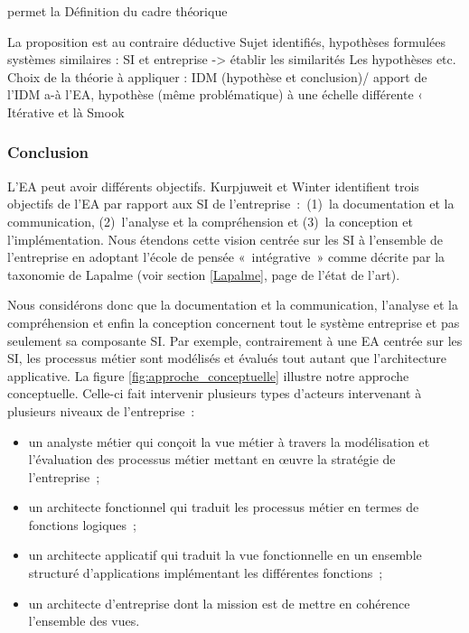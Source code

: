 permet la Définition du cadre théorique 

La proposition est au contraire déductive
Sujet identifiés, hypothèses formulées
systèmes similaires : SI et entreprise -> établir les similarités
Les hypothèses etc.  
Choix de la théorie à appliquer : IDM (hypothèse et conclusion)/ apport de l'IDM 
a-à l'EA, hypothèse (même problématique) à une échelle différente  ‹
Itérative et là Smook 

	\subsubsection{Conclusion}
	
	
	
	
	
	
	

L'EA peut avoir différents objectifs. Kurpjuweit et Winter 
\cite{kurpjuweit2007viewpoint} identifient trois objectifs de l'EA par rapport 
aux SI de l'entreprise~:~(1)~la documentation et la communication, (2)~l'analyse 
et la compréhension et (3)~la conception et l'implémentation. Nous étendons 
cette vision centrée sur les SI à l'ensemble de l'entreprise en adoptant l'école 
de pensée «~intégrative~» comme décrite par la taxonomie de Lapalme (voir 
section \ref{Lapalme}, page \pageref{Lapalme} de l'état de l'art). 

Nous considérons donc que la documentation et la communication, l'analyse et la 
compréhension et enfin la conception concernent tout le système entreprise et 
pas seulement sa composante SI. Par exemple, contrairement à une EA centrée sur 
les SI, les processus métier sont modélisés et évalués tout autant que 
l'architecture applicative. La figure \ref{fig:approche_conceptuelle} illustre 
notre approche conceptuelle. Celle-ci fait intervenir plusieurs types d'acteurs 
intervenant à plusieurs niveaux de l'entreprise~:
\begin{itemize}
\item un analyste métier qui conçoit la vue métier à travers la modélisation et 
l'évaluation des processus métier mettant en œuvre la stratégie de 
l'entreprise~;
\item un architecte fonctionnel qui traduit les processus métier en termes de 
fonctions logiques~;
\item un architecte applicatif qui traduit la vue fonctionnelle en un ensemble 
structuré d'applications implémentant les différentes fonctions~;
\item un architecte d'entreprise dont la mission est de mettre en cohérence 
l'ensemble des vues.
\end{itemize}

